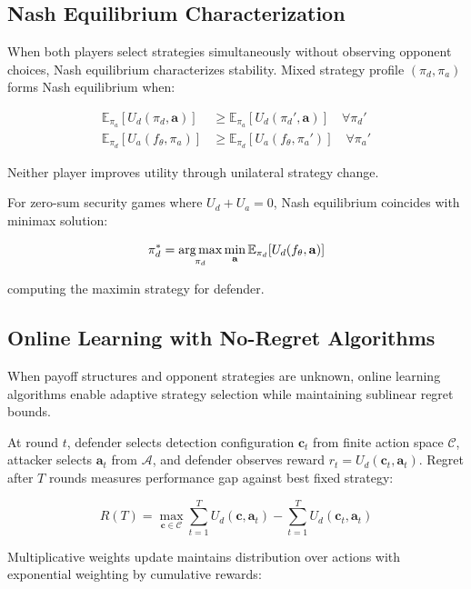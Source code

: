 \subsection{Nash Equilibrium Characterization}

When both players select strategies simultaneously without observing opponent choices, Nash equilibrium characterizes stability. Mixed strategy profile $(\pi_d, \pi_a)$ forms Nash equilibrium when:

\begin{align}
\mathbb{E}_{\pi_a}[U_d(\pi_d, \mathbf{a})] &\geq \mathbb{E}_{\pi_a}[U_d(\pi_d', \mathbf{a})] \quad \forall \pi_d' \\
\mathbb{E}_{\pi_d}[U_a(f_\theta, \pi_a)] &\geq \mathbb{E}_{\pi_d}[U_a(f_\theta, \pi_a')] \quad \forall \pi_a'
\end{align}

Neither player improves utility through unilateral strategy change.

For zero-sum security games where $U_d + U_a = 0$, Nash equilibrium coincides with minimax solution:

\begin{equation}
\pi_d^* = \operatorname*{arg\,max}_{\pi_d} \min_\mathbf{a} \mathbb{E}_{\pi_d}[U_d(f_\theta, \mathbf{a})]
\end{equation}

computing the maximin strategy for defender.

\subsection{Online Learning with No-Regret Algorithms}

When payoff structures and opponent strategies are unknown, online learning algorithms enable adaptive strategy selection while maintaining sublinear regret bounds.

At round $t$, defender selects detection configuration $\mathbf{c}_t$ from finite action space $\mathcal{C}$, attacker selects $\mathbf{a}_t$ from $\mathcal{A}$, and defender observes reward $r_t = U_d(\mathbf{c}_t, \mathbf{a}_t)$. Regret after $T$ rounds measures performance gap against best fixed strategy:

\begin{equation}
R(T) = \max_{\mathbf{c} \in \mathcal{C}} \sum_{t=1}^T U_d(\mathbf{c}, \mathbf{a}_t) - \sum_{t=1}^T U_d(\mathbf{c}_t, \mathbf{a}_t)
\end{equation}

Multiplicative weights update maintains distribution over actions with exponential weighting by cumulative rewards:

